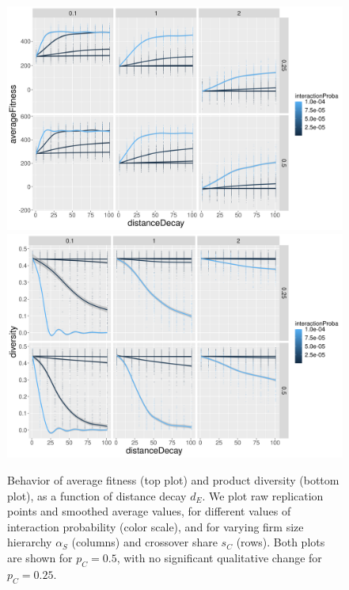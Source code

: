 \documentclass[letterpaper]{article}
\begin{document}
\begin{figure}[H]
\begin{center}
\includegraphics[width=0.9\linewidth]{figures/averageFitness-distanceDecay_color-interactionProba_facet-crossOverShare-firmSizeScaling_crossOverProba0.5.png}\\
\includegraphics[width=0.9\linewidth]{figures/diversity-distanceDecay_color-interactionProba_facet-crossOverShare-firmSizeScaling_crossOverProba0.5.png}\\
\caption{Behavior of average fitness (top plot) and product diversity (bottom plot), as a function of distance decay $d_E$. We plot raw replication points and smoothed average values, for different values of interaction probability (color scale), and for varying firm size hierarchy $\alpha_S$ (columns) and crossover share $s_C$ (rows). Both plots are shown for $p_C = 0.5$, with no significant qualitative change for $p_C = 0.25$.}
\label{fig:fig1}
\end{center}
\end{figure}
\end{document}
